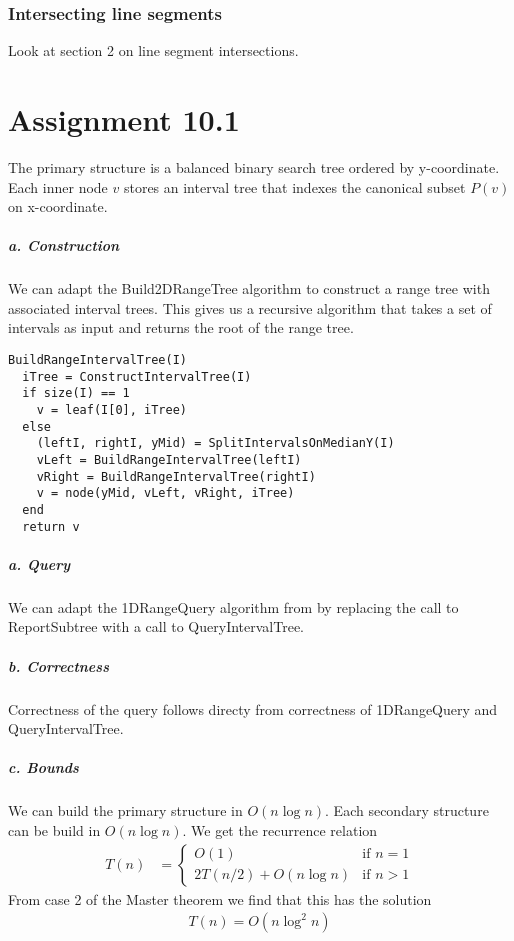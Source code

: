 \documentclass[10pt,a4paper,final,oneside,openany,article]{memoir}
\newcommand{\twopartdef}[4] {
  \left\{
    \begin{array}{ll}
      #1 & \mbox{if } #2 \\
      {#3} & \mbox{if } #4
    \end{array}
  \right.
}
\begin{document}
\subsection*{Intersecting line segments}
Look at section 2 on line segment intersections.


\chapter*{Assignment 10.1}
The primary structure is a balanced binary search tree ordered by y-coordinate. Each inner node $v$ stores an interval tree that indexes the canonical subset $P(v)$ on x-coordinate.

\paragraph{a. Construction}
We can adapt the {\sc Build2DRangeTree} algorithm to construct a range tree with associated interval trees. This gives us a recursive algorithm that takes a set of intervals as input and returns the root of the range tree.
\begin{verbatim}
BuildRangeIntervalTree(I)  
  iTree = ConstructIntervalTree(I)
  if size(I) == 1
    v = leaf(I[0], iTree)
  else
    (leftI, rightI, yMid) = SplitIntervalsOnMedianY(I)
    vLeft = BuildRangeIntervalTree(leftI)
    vRight = BuildRangeIntervalTree(rightI)
    v = node(yMid, vLeft, vRight, iTree)
  end
  return v
\end{verbatim}

\paragraph{a. Query}
We can adapt the {\sc 1DRangeQuery} algorithm from \cite{deBerg} by replacing the call to {\sc ReportSubtree} with a call to {\sc QueryIntervalTree}.


\paragraph{b. Correctness}
Correctness of the query follows directy from correctness of {\sc 1DRangeQuery} and {\sc QueryIntervalTree}.


\paragraph{c. Bounds}
We can build the primary structure in $O(n \log n)$. Each secondary structure can be build in $O(n \log n)$. We get the recurrence relation
\begin{align*}
  T(n) &= \twopartdef{O(1)}{n = 1}{2T(n/2) + O(n \log n)}{n > 1}
\end{align*}
From case 2 of the Master theorem we find that this has the solution
\begin{align*}
  T(n) = O(n \log^2 n)
\end{align*}
\end{document}
